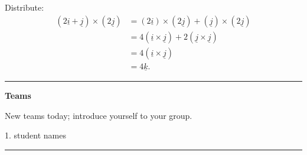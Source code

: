 \documentclass[12pt,letterpaper,noanswers]{exam}
\newcommand{\mb}[1]{\underline{#1}}
\begin{document}
\begin{questions}
    \item Distribute: \begin{align*}
    (2\mb{i}+\mb{j})\times(2\mb{j}) &= (2\mb{i})\times(2\mb{j})+ (\mb{j})\times(2\mb{j}) \\
    &= 4(\mb{i}\times \mb{j})+ 2(\mb{j}\times \mb{j}) \\
    &= 4(\mb{i}\times \mb{j}) \\
    &= 4\mb{k}.
    \end{align*}
\end{questions}

\vspace{0.2cm}

\hrule
\vspace{0.2cm}


\noindent\textbf{Teams}


New teams today; introduce yourself to your group.

\begin{multicols}{2}

1.  student names

\end{multicols}


\vspace{0.2cm}
\hrule
\vspace{0.2cm}
\end{document}

